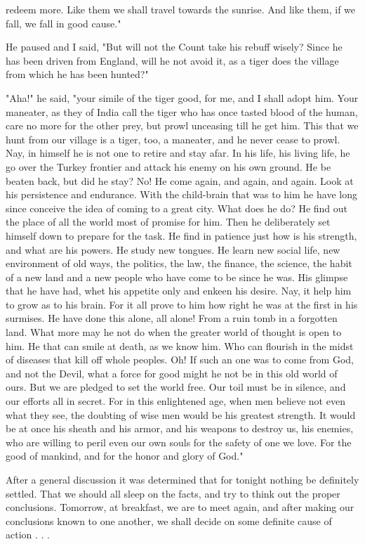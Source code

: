 redeem more. Like them we shall travel towards the sunrise. And like them, if we fall, we fall in good cause." 

He paused and I said, "But will not the Count take his rebuff wisely? Since he has been driven from England, will he not avoid it, as a tiger does the village from which he has been hunted?" 

"Aha!" he said, "your simile of the tiger good, for me, and I shall adopt him. Your maneater, as they of India call the tiger who has once tasted blood of the human, care no more for the other prey, but prowl unceasing till he get him. This that we hunt from our village is a tiger, too, a maneater, and he never cease to prowl. Nay, in himself he is not one to retire and stay afar. In his life, his living life, he go over the Turkey frontier and attack his enemy on his own ground. He be beaten back, but did he stay? No! He come again, and again, and again. Look at his persistence and endurance. With the child-brain that was to him he have long since conceive the idea of coming to a great city. What does he do? He find out the place of all the world most of promise for him. Then he deliberately set himself down to prepare for the task. He find in patience just how is his strength, and what are his powers. He study new tongues. He learn new social life, new environment of old ways, the politics, the law, the finance, the science, the habit of a new land and a new people who have come to be since he was. His glimpse that he have had, whet his appetite only and enkeen his desire. Nay, it help him to grow as to his brain. For it all prove to him how right he was at the first in his surmises. He have done this alone, all alone! From a ruin tomb in a forgotten land. What more may he not do when the greater world of thought is open to him. He that can smile at death, as we know him. Who can flourish in the midst of diseases that kill off whole peoples. Oh! If such an one was to come from God, and not the Devil, what a force for good might he not be in this old world of ours. But we are pledged to set the world free. Our toil must be in silence, and our efforts all in secret. For in this enlightened age, when men believe not even what they see, the doubting of wise men would be his greatest strength. It would be at once his sheath and his armor, and his weapons to destroy us, his enemies, who are willing to peril even our own souls for the safety of one we love. For the good of mankind, and for the honor and glory of God." 

After a general discussion it was determined that for tonight nothing be definitely settled. That we should all sleep on the facts, and try to think out the proper conclusions. Tomorrow, at breakfast, we are to meet again, and after making our conclusions known to one another, we shall decide on some definite cause of action . . . 

